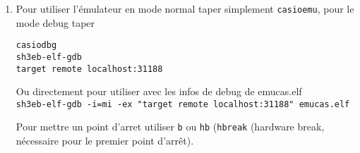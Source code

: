 \documentclass{article}
\begin{document}
\begin{giacjshere}
\begin{enumerate}
Ensuite on cr\'ee deux scripts, \verb|casioemu| pour lancer
en mode normal
\begin{verbatim}
#! /bin/bash
cd ~/.wine/drive_c/Program\ Files\ \(x86\)/CASIO/fx-CG\ Manager\ PLUS\ Subscription\ for\ fx-CG50series
/bin/cp CPU73050.real.dll CPU73050.dll
cd
wine "C:\Program Files (x86)\CASIO\fx-CG Manager PLUS Subscription for fx-CG50series\fx-CG_Manager_PLUS_Subscription_for_fx-CG50series.exe" /n"fx-CG Manager PLUS Subscription for fx-CG50series" > /dev/null &
\end{verbatim}
et \verb|casiodbg| pour lancer en mode debug
\begin{verbatim}
#! /bin/bash
cd ~/.wine/drive_c/Program\ Files\ \(x86\)/CASIO/fx-CG\ Manager\ PLUS\ Subscription\ for\ fx-CG50series
/bin/cp CPU73050.dbg.dll CPU73050.dll
cd
wine "C:\Program Files (x86)\CASIO\fx-CG Manager PLUS Subscription for fx-CG50series\fx-CG_Manager_PLUS_Subscription_for_fx-CG50series.exe" /n"fx-CG Manager PLUS Subscription for fx-CG50series" > /dev/null &
\end{verbatim}

\item Pour utiliser l'\'emulateur en mode normal 
taper simplement \verb|casioemu|, pour le mode debug taper
\begin{verbatim}
casiodbg
sh3eb-elf-gdb
target remote localhost:31188
\end{verbatim}

Ou directement pour utiliser avec les infos de debug de emucas.elf\\
\verb|sh3eb-elf-gdb -i=mi -ex "target remote localhost:31188" emucas.elf|

Pour mettre un point d'arret utiliser \verb|b| ou \verb|hb| (\verb|hbreak|
(hardware break, n\'ecessaire pour le premier point d'arr\^et).
\end{enumerate}

\end{giacjshere}
\end{document}
